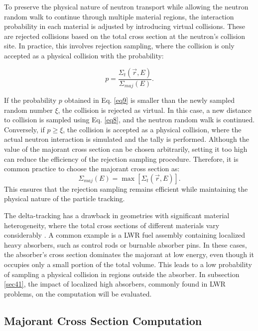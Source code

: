 To preserve the physical nature of neutron transport while allowing the neutron random walk to continue through multiple material regions, the interaction probability in each material is adjusted by introducing virtual collisions. These are rejected collisions based on the total cross section at the neutron's collision site. In practice, this involves rejection sampling, where the collision is only accepted as a physical collision with the probability:

\begin{equation}
    p = \frac{\Sigma_t(\vec{r},E)}{\Sigma_{maj}(E)}.
    \label{eq9}
\end{equation}

If the probability $p$ obtained in Eq. \ref{eq9} is smaller than the newly sampled random number $\xi$, the collision is rejected as virtual. In this case, a new distance to collision is sampled using Eq. \ref{eq8}, and the neutron random walk is continued. Conversely, if $p \geq \xi$, the collision is accepted as a physical collision, where the actual neutron interaction is simulated and the tally is performed. Although the value of the majorant cross section can be chosen arbitrarily, setting it too high can reduce the efficiency of the rejection sampling procedure. Therefore, it is common practice to choose the majorant cross section as:
\begin{equation}
    \Sigma_{maj}(E) = \max{\left[\Sigma_t(\vec{r},E)\right]}.
    \label{eq10}
\end{equation}
This ensures that the rejection sampling remains efficient while maintaining the physical nature of the particle tracking.

The delta-tracking has a drawback in geometries with significant material heterogeneity, where the total cross sections of different materials vary considerably \cite{leppanen_2010}. A common example is a LWR fuel assembly containing localized heavy absorbers, such as control rods or burnable absorber pins. In these cases, the absorber's cross section dominates the majorant at low energy, even though it occupies only a small portion of the total volume. This leads to a low probability of sampling a physical collision in regions outside the absorber. In subsection \ref{sec41}, the impact of localized high absorbers, commonly found in LWR problems, on the computation will be evaluated.

\subsection{Majorant Cross Section Computation} \label{sec24}

